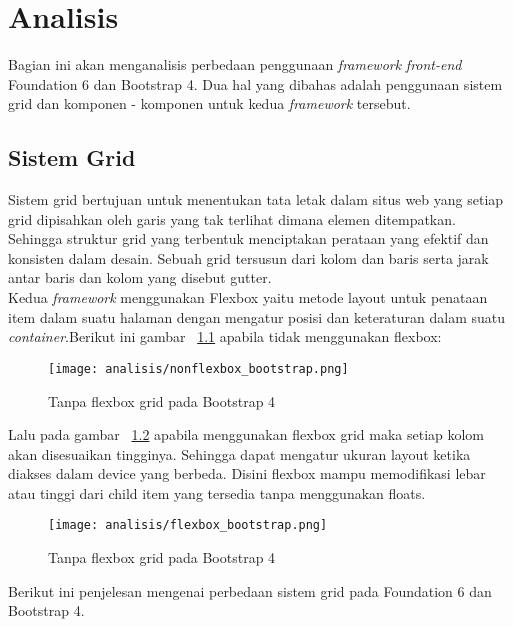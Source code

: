 \chapter{Analisis}
Bagian ini akan menganalisis perbedaan penggunaan \textit{framework} \textit{front-end} Foundation 6 dan Bootstrap 4. Dua hal yang dibahas adalah penggunaan sistem grid dan komponen - komponen untuk kedua \textit{framework} tersebut.
\section{Sistem Grid}
Sistem grid bertujuan untuk menentukan tata letak dalam situs web yang setiap grid dipisahkan oleh garis yang tak terlihat dimana elemen ditempatkan.  Sehingga struktur grid yang terbentuk menciptakan perataan yang efektif dan konsisten dalam desain. Sebuah grid tersusun dari kolom dan baris serta jarak antar baris dan kolom yang disebut gutter. \\
\noindent Kedua \textit{framework} menggunakan Flexbox yaitu metode layout untuk penataan item dalam suatu halaman dengan mengatur posisi dan keteraturan dalam suatu \textit{container}.\noindent Berikut ini gambar ~\ref{fig:nonflexbox} apabila tidak menggunakan flexbox:
\begin{figure} [H]
	\centering  
	\texttt{[image: analisis/nonflexbox\_bootstrap.png]}  
	\caption{Tanpa flexbox grid pada Bootstrap 4}
	\label{fig:nonflexbox}	 
\end{figure}
\noindent Lalu pada gambar ~\ref{fig:flexbox} apabila menggunakan flexbox grid maka setiap kolom akan disesuaikan tingginya. Sehingga dapat mengatur ukuran layout ketika diakses dalam device yang berbeda. Disini flexbox mampu memodifikasi lebar atau tinggi dari child item yang tersedia tanpa menggunakan floats.
\begin{figure} [H]
	\centering  
	\texttt{[image: analisis/flexbox\_bootstrap.png]}  
	\caption{Tanpa flexbox grid pada Bootstrap 4}
	\label{fig:flexbox}	 
\end{figure}
Berikut ini penjelesan mengenai perbedaan sistem grid pada Foundation 6 dan Bootstrap 4.
